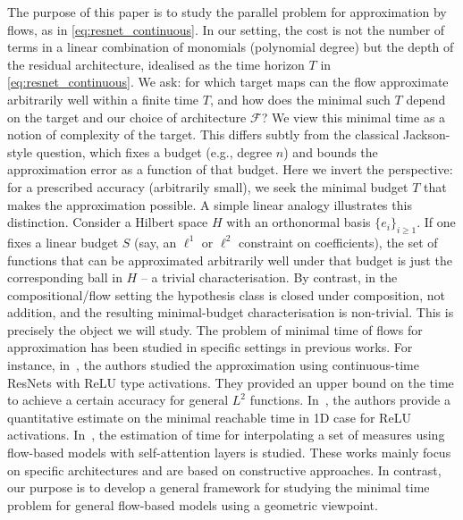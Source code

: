 \documentclass[12pt]{amsart}
\numberwithin{equation}{section}
\theoremstyle{remark}
\newcommand{\ql}[1]{\texttt{\color{cyan} QL: \footnotesize #1}}
\begin{document}
The purpose of this paper is to study the parallel problem for approximation by flows, as in \cref{eq:resnet_continuous}. In our setting, the cost is not the number of terms in a linear combination of monomials (polynomial degree) but the depth of the residual architecture, idealised as the time horizon $T$ in \cref{eq:resnet_continuous}. We ask: for which target maps can the flow approximate arbitrarily well within a finite time $T$, and how does the minimal such $T$ depend on the target and our choice of architecture $\mathcal F$? We view this minimal time as a notion of complexity of the target.
This differs subtly from the classical Jackson-style question, which fixes a budget (e.g., degree $n$) and bounds the approximation error as a function of that budget. Here we invert the perspective: for a prescribed accuracy (arbitrarily small), we seek the minimal budget $T$ that makes the approximation possible. A simple linear analogy illustrates this distinction.
Consider a Hilbert space $H$ with an orthonormal basis $\{e_i\}_{i\ge 1}$. If one fixes a linear budget $S$ (say, an $\ell^1$ or $\ell^2$ constraint on coefficients), the set of functions that can be approximated arbitrarily well under that budget is just the corresponding ball in $H$ -- a trivial characterisation. By contrast, in the compositional/flow setting the hypothesis class is closed under composition, not addition, and the resulting minimal-budget characterisation is non-trivial.
This is precisely the object we will study.
The problem of minimal time of flows for approximation has been studied in specific settings in previous works.
For instance, in~\cite{ruiz2023neural}, the authors studied the approximation using continuous-time ResNets with ReLU type activations. They provided an upper bound on the time to achieve a certain accuracy for general $L^2$ functions. In~\cite{li2022deep}, the authors provide a quantitative estimate on the minimal reachable time in 1D case for ReLU activations. In~\cite{geshkovski2024measure}, the estimation of time for interpolating a set of measures using flow-based models with self-attention layers is studied.
These works mainly focus on specific architectures and are based on constructive approaches.
In contrast, our purpose is to develop a general framework for studying the minimal time problem for general flow-based models using a geometric viewpoint.
\end{document}
